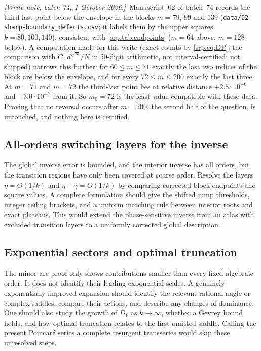 \documentclass[11pt,a4paper]{article}
\numberwithin{equation}{section}
\theoremstyle{definition}
\theoremstyle{remark}
\newcommand{\writenotefour}[1]{\par\smallskip\noindent
 \textit{[Write note, batch 74, 1 October 2026.]}\ #1\par\smallskip}
\begin{document}
\writenotefour{Manuscript~02 of batch~74 records the third-last point
below the envelope in the blocks $m=79$, $99$ and $139$
(\texttt{data/02-sharp-boundary\_defects.csv}; it labels them by the upper
squares $k=80,100,140$), consistent with \cref{srp:tab:endpoints}
($m=64$ above, $m=128$ below). A computation made for this write (exact
counts by \eqref{srp:eq:DP}; the comparison with $C_-d^{\sqrt N}/N$ in
50-digit arithmetic, not interval-certified; not shipped) narrows this
further: for $60\le m\le71$ exactly the last two indices of the block are
below the envelope, and for every $72\le m\le200$ exactly the last three.
At $m=71$ and $m=72$ the third-last point lies at relative distance
$+2.8\cdot10^{-6}$ and $-3.0\cdot10^{-7}$ from it. So $m_0=72$ is the
least value compatible with these data. Proving that no reversal occurs
after $m=200$, the second half of the question, is untouched, and nothing
here is certified.}

\subsection{All-orders switching layers for the inverse}
The global inverse error is bounded, and the interior inverse has all
orders, but the transition regions have only been covered at coarse
order. Resolve the layers
$\eta=O(1/k)$ and $\eta-\gamma=O(1/k)$ by comparing corrected block
endpoints and square values. A complete formulation should give the
shifted jump thresholds, integer ceiling brackets, and a uniform
matching rule between interior roots and exact plateaus. This would
extend the phase-sensitive inverse from an atlas with excluded
transition layers to a uniformly corrected global description.

\subsection{Exponential sectors and optimal truncation}
The minor-arc proof only shows contributions smaller than every fixed
algebraic order. It does not identify their leading exponential scales.
A genuinely exponentially improved expansion should identify the
relevant rational-angle or complex saddles, compare their actions, and
describe any changes of dominance. One should also study the growth of
$D_k$ as $k\to\infty$, whether a Gevrey bound holds, and how optimal
truncation relates to the first omitted saddle. Calling the present
Poincar\'e series a complete resurgent transseries would skip these
unresolved steps.
\end{document}
